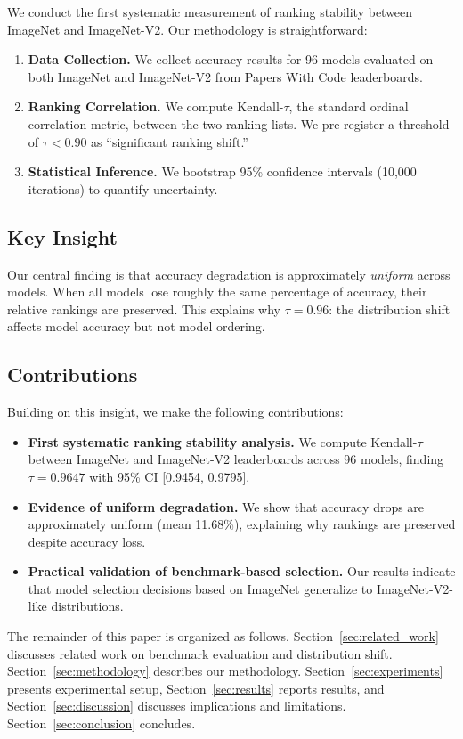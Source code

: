 We conduct the first systematic measurement of ranking stability between ImageNet and ImageNet-V2. Our methodology is straightforward:

\begin{enumerate}
    \item \textbf{Data Collection.} We collect accuracy results for 96 models evaluated on both ImageNet and ImageNet-V2 from Papers With Code leaderboards.
    \item \textbf{Ranking Correlation.} We compute Kendall-$\tau$, the standard ordinal correlation metric, between the two ranking lists. We pre-register a threshold of $\tau < 0.90$ as ``significant ranking shift.''
    \item \textbf{Statistical Inference.} We bootstrap 95\% confidence intervals (10,000 iterations) to quantify uncertainty.
\end{enumerate}

\subsection{Key Insight}

Our central finding is that accuracy degradation is approximately \emph{uniform} across models. When all models lose roughly the same percentage of accuracy, their relative rankings are preserved. This explains why $\tau = 0.96$: the distribution shift affects model accuracy but not model ordering.

\subsection{Contributions}

Building on this insight, we make the following contributions:

\begin{itemize}
    \item \textbf{First systematic ranking stability analysis.} We compute Kendall-$\tau$ between ImageNet and ImageNet-V2 leaderboards across 96 models, finding $\tau = 0.9647$ with 95\% CI [0.9454, 0.9795].
    \item \textbf{Evidence of uniform degradation.} We show that accuracy drops are approximately uniform (mean 11.68\%), explaining why rankings are preserved despite accuracy loss.
    \item \textbf{Practical validation of benchmark-based selection.} Our results indicate that model selection decisions based on ImageNet generalize to ImageNet-V2-like distributions.
\end{itemize}

The remainder of this paper is organized as follows. Section~\ref{sec:related_work} discusses related work on benchmark evaluation and distribution shift. Section~\ref{sec:methodology} describes our methodology. Section~\ref{sec:experiments} presents experimental setup, Section~\ref{sec:results} reports results, and Section~\ref{sec:discussion} discusses implications and limitations. Section~\ref{sec:conclusion} concludes.

